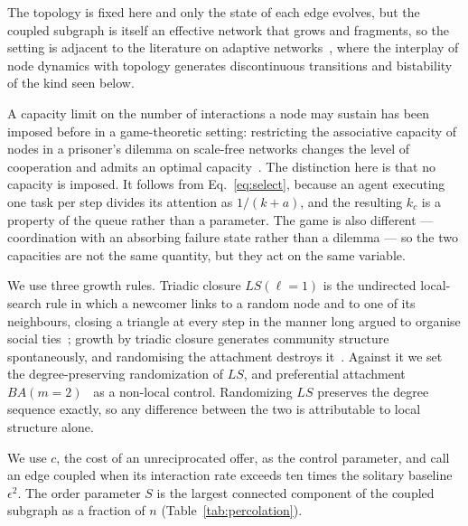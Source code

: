 \documentclass[aps,pre,twocolumn,superscriptaddress,floatfix,longbibliography]{revtex4-2}
\begin{document}
The topology is fixed here and only the state of each edge evolves, but the
coupled subgraph is itself an effective network that grows and fragments, so the
setting is adjacent to the literature on adaptive
networks~\cite{gross2008}, where the interplay of node dynamics with topology
generates discontinuous transitions and bistability of the kind seen below.

A capacity limit on the number of interactions a node may sustain has been
imposed before in a game-theoretic setting: restricting the associative capacity
of nodes in a prisoner's dilemma on scale-free networks changes the level of
cooperation and admits an optimal capacity~\cite{poncela2011}. The distinction
here is that no capacity is imposed. It follows from Eq.~\eqref{eq:select},
because an agent executing one task per step divides its attention as
$1/(k+a)$, and the resulting $k_c$ is a property of the queue rather than a
parameter. The game is also different --- coordination with an absorbing
failure state rather than a dilemma --- so the two capacities are not the same
quantity, but they act on the same variable.

We use three growth rules. Triadic closure $LS(\ell=1)$ is the undirected
local-search rule in which a newcomer links to a random node and to one of its
neighbours, closing a triangle at every step in the manner long argued to
organise social ties~\cite{granovetter1973}; growth by triadic closure
generates community structure spontaneously, and randomising the attachment
destroys it~\cite{bianconi2014}. Against it we set the degree-preserving
randomization of $LS$, and preferential attachment
$BA(m=2)$~\cite{barabasi1999} as a non-local control. Randomizing $LS$
preserves the degree sequence exactly, so any difference between the two is
attributable to local structure alone.

We use $c$, the cost of an unreciprocated offer, as the control parameter, and
call an edge coupled when its interaction rate exceeds ten times the solitary
baseline $\epsilon^2$. The order parameter $S$ is the largest connected
component of the coupled subgraph as a fraction of $n$
(Table~\ref{tab:percolation}).
\end{document}
